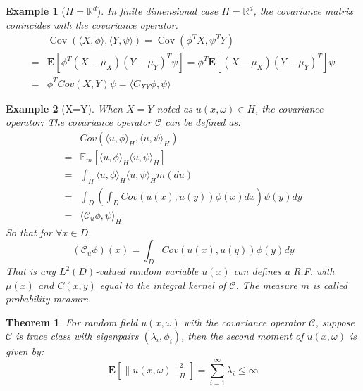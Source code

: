 \documentclass{article}
\newtheorem{theorem}{Theorem}
\newtheorem{example}{Example}
\begin{document}
\begin{example}[$H = \mathbb{R}^d$]
  In finite dimensional case $H = \mathbb{R}^d$, the covariance matrix conincides with the covariance operator. 
  \begin{equation}
      \begin{aligned}
          &\operatorname{Cov}\left(\langle X, \phi\rangle, \langle Y, \psi\rangle\right) 
          = \operatorname{Cov}\left(\phi^T X, \psi^T Y\right)\\
          =&\mathbf{E}\left[\phi^T(X-\mu_X)(Y-\mu_Y)^T\psi\right] 
          = \phi^T\mathbf{E}\left[(X-\mu_X)(Y-\mu_Y)^T\right]\psi\\
          =&\phi^T Cov(X, Y)\psi = \langle C_{XY}\phi, \psi\rangle
      \end{aligned}
  \end{equation}
\end{example}

\begin{example}[X=Y]
  When $X = Y$ noted as $u(x, \omega)\in H$, the covariance operator:
  The covariance operator $\mathcal{C}$ can be defined as:
  \begin{equation}
    \begin{aligned}
      &Cov\left(\langle u, \phi\rangle_{H}, \langle u, \psi\rangle_{H}\right)\\
      =&\mathbb{E}_m\left[\langle u, \phi\rangle_{H}\langle u, \psi\rangle_{H}\right]\\
      =& \int_{H}\langle u, \phi\rangle_{H}\langle u, \psi\rangle_{H} m(du)\\
      =&\int_D\left(\int_D Cov(u(x), u(y)) \phi(x) dx \right) \psi(y) dy\\
      =& \langle\mathcal{C}_u\phi, \psi\rangle_{H} 
    \end{aligned}
   \end{equation}
  So that for $\forall x\in D$,
  \begin{equation}
  (\mathcal{C}_u\phi)(x) = \int_D Cov(u(x), u(y)) \phi(y) dy
  \end{equation}
  That is any $L^2(D)$-valued random variable $u(x)$ can defines a R.F. with $\mu(x)$ and $C(x, y)$ equal to the integral kernel of $\mathcal{C}$.
  The measure $m$ is called probability measure.
\end{example}

\begin{theorem}\label{thmtraceclass}
  For random field $u(x,\omega)$ with the covariance operator $\mathcal{C}$, suppose $\mathcal{C}$ is trace class with eigenpairs $(\lambda_i, \phi_i)$, 
  then the second moment of $u(x, \omega)$ is given by:
  \begin{equation}
    \mathbf{E}[\|u(x, \omega)\|^2_H] = \sum_{i=1}^{\infty} \lambda_i\leq \infty
  \end{equation}
\end{theorem}
\end{document}
